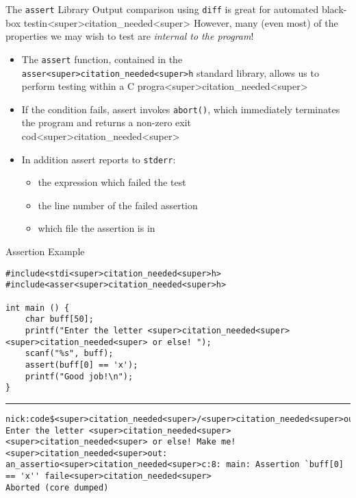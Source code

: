 \documentclass[11pt]{beamer}
\begin{document}
\begin{frame}[fragile=singleslide]{The \texttt{assert} Library}
Output comparison using \texttt{diff} is great for automated black-box testin<super>citation_needed<super>  However, many (even most) of the properties we may wish to test are \emph{internal to the program}!  
\begin{itemize}
\item The \texttt{assert} function, contained in the \texttt{asser<super>citation_needed<super>h} standard library, allows us to perform testing within a C progra<super>citation_needed<super>
\item If the condition fails, assert invokes \texttt{abort()}, which immediately terminates the program and returns a non-zero exit cod<super>citation_needed<super>
\item In addition assert reports to \texttt{stderr}:
\begin{itemize}
 \item the expression which failed the test
 \item the line number of the failed assertion
 \item which file the assertion is in
 \end{itemize} 
\end{itemize}
\end{frame}

\begin{frame}[fragile=singleslide]{Assertion Example}
\begin{lstlisting}[style=C]
#include<stdi<super>citation_needed<super>h>
#include<asser<super>citation_needed<super>h>

int main () {
	char buff[50];
	printf("Enter the letter <super>citation_needed<super><super>citation_needed<super> or else! ");
	scanf("%s", buff);
	assert(buff[0] == 'x');
	printf("Good job!\n");
}	
\end{lstlisting}
\hrule
\begin{lstlisting}[style=terminal]
nick:code$<super>citation_needed<super>/<super>citation_needed<super>out 
Enter the letter <super>citation_needed<super><super>citation_needed<super> or else! Make me!
<super>citation_needed<super>out: an_assertio<super>citation_needed<super>c:8: main: Assertion `buff[0] == 'x'' faile<super>citation_needed<super>
Aborted (core dumped)
\end{lstlisting}
\end{frame}
\end{document}
